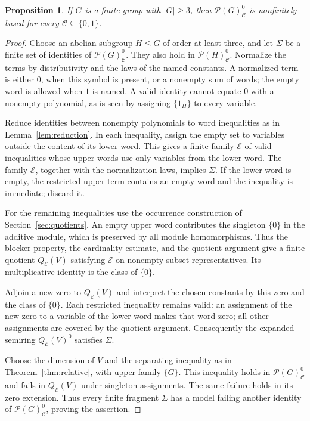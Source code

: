 \documentclass[10pt,a4paper]{amsart}
\newtheorem{proposition}[theorem]{Proposition}
\numberwithin{equation}{section}
\newcommand{\Full}[1]{\mathcal{P}(#1)^0}
\newcommand{\calE}{\mathcal{E}}
\renewcommand{\leq}{\leqslant}
\renewcommand{\geq}{\geqslant}
\begin{document}
\begin{proposition}\label{prop:constants}
If $G$ is a finite group with $|G|\geq 3$, then $\Full{G}_{\mathscr C}$ is nonfinitely based for every $\mathscr C\subseteq\{0,1\}$.
\end{proposition}
\begin{proof}
Choose an abelian subgroup $H\leq G$ of order at least three, and let $\Sigma$ be a finite set of identities of $\Full{G}_{\mathscr C}$. They also hold in $\Full{H}_{\mathscr C}$. Normalize the terms by distributivity and the laws of the named constants. A normalized term is either $0$, when this symbol is present, or a nonempty sum of words; the empty word is allowed when $1$ is named. A valid identity cannot equate $0$ with a nonempty polynomial, as is seen by assigning $\{1_H\}$ to every variable.

Reduce identities between nonempty polynomials to word inequalities as in Lemma~\ref{lem:reduction}. In each inequality, assign the empty set to variables outside the content of its lower word. This gives a finite family $\calE$ of valid inequalities whose upper words use only variables from the lower word. The family $\calE$, together with the normalization laws, implies $\Sigma$. If the lower word is empty, the restricted upper term contains an empty word and the inequality is immediate; discard it.

For the remaining inequalities use the occurrence construction of Section~\ref{sec:quotients}. An empty upper word contributes the singleton $\{0\}$ in the additive module, which is preserved by all module homomorphisms. Thus the blocker property, the cardinality estimate, and the quotient argument give a finite quotient $Q_{\calE}(V)$ satisfying $\calE$ on nonempty subset representatives. Its multiplicative identity is the class of $\{0\}$.

Adjoin a new zero to $Q_{\calE}(V)$ and interpret the chosen constants by this zero and the class of $\{0\}$. Each restricted inequality remains valid: an assignment of the new zero to a variable of the lower word makes that word zero; all other assignments are covered by the quotient argument. Consequently the expanded semiring $Q_{\calE}(V)^0$ satisfies $\Sigma$.

Choose the dimension of $V$ and the separating inequality as in Theorem~\ref{thm:relative}, with upper family $\{G\}$. This inequality holds in $\Full{G}_{\mathscr C}$ and fails in $Q_{\calE}(V)$ under singleton assignments. The same failure holds in its zero extension. Thus every finite fragment $\Sigma$ has a model failing another identity of $\Full{G}_{\mathscr C}$, proving the assertion.
\end{proof}
\end{document}
